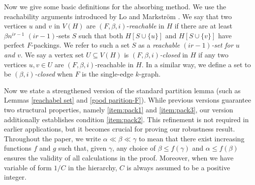 \documentclass[11pt, letterpaper]{amsart}
\theoremstyle{plain}
\numberwithin{equation}{section}
\theoremstyle{definition}
\newtheorem{construction}[thm]{Construction}
\newcommand\card[1]{\left| #1 \right|}
\begin{document}
    \iffalse
    The simplest example of such a barrier is given by the following construction, which appears as one of the two extremal examples in \cite{rodl2009perfect}.
    
    \begin{construction}
        Let \(X\) and \(Y\) be disjoint sets such that \(\card{X\cup Y}=n\) and \(\card{X}\) is odd, and let \(H\) be the \(k\)-graph on \(X\cup Y\) whose edges are all \(k\)-sets which intersect \(X\) in an even number of vertices.
    \end{construction}

    To describe divisibility barriers in general, we make the following definition. 
    In this paper, every partition has an implicit order on its parts. 
    \fi

    Now we give some basic definitions for the absorbing method.
    We use the reachability arguments introduced by Lo and Markstr\"{o}m \cite{lo2015f}. 
    We say that two vertices \(u\) and \(v\) in \(V(H)\) are \((F,\beta,i)\)-\emph{reachable} in \(H\) if there are at least \(\beta n^{ir - 1}\) \((ir-1)\)-sets \(S\) such that both \( H[S\cup\{u\}] \) and \( H[S\cup\{v\}] \) have perfect \(F\)-packings. 
    We refer to such a set \(S\) as a \emph{reachable} \((ir-1)\)\emph{-set for \( u \) and \( v \)}.
    We say a vertex set \( U \subseteq V(H) \) is \((F, \beta,i)\)\emph{-closed} in \( H \) if any two vertices \( u,v\in U \) are \((F,\beta,i)\)-reachable in \( H \). In a similar way, we define a set to be \((\beta,i)\)\emph{-closed} when \( F \) is the single-edge \( k \)-graph.
    


    Now we state a strengthened version of the standard partition lemma (such as Lemmas \ref{reachabel set} and \ref{good parition-F}). 
    While previous versions guarantee two structural properties, namely \ref{item:pack1} and \ref{item:pack3}, our version additionally establishes condition \ref{item:pack2}. 
    This refinement is not required in earlier applications, but it becomes crucial for proving our robustness result.
    Throughout the paper, we write \(\alpha\ll \beta\ll\gamma\) to mean that there exist increasing functions \(f\) and \(g\) such that, given \(\gamma\), any choice of \(\beta\le f(\gamma)\) and \( \alpha\le f(\beta) \) ensures the validity of all calculations in the proof.
    Moreover, when we have variable of form $1/C$ in the hierarchy, $C$ is always assumed to be a positive integer.
    
\end{document}
